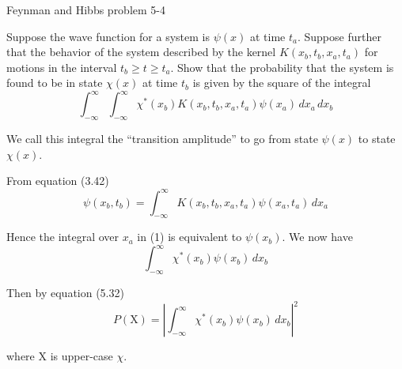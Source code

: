 \documentclass[12pt]{article}
\begin{document}
\begin{center}
Feynman and Hibbs problem 5-4
\end{center}

Suppose the wave function for a system is $\psi(x)$ at time $t_a$.
Suppose further that the behavior of the system described by
the kernel $K(x_b,t_b,x_a,t_a)$ for motions in the interval
$t_b\ge t\ge t_a$.
Show that the probability that the system is found to be in state
$\chi(x)$ at time $t_b$ is given by the square of the integral
\begin{equation*}
\int_{-\infty}^\infty\int_{-\infty}^\infty
\chi^*(x_b)
K(x_b,t_b,x_a,t_a)
\psi(x_a)
\,dx_a\,dx_b
\tag{1}
\end{equation*}

We call this integral the ``transition amplitude'' to go from
state $\psi(x)$ to state $\chi(x)$.

\bigskip
From equation (3.42)
\begin{equation*}
\psi(x_b,t_b)=\int_{-\infty}^\infty
K(x_b,t_b,x_a,t_a)
\psi(x_a,t_a)
\,dx_a
\end{equation*}

Hence the integral over $x_a$ in (1) is equivalent to $\psi(x_b)$.
We now have
\begin{equation*}
\int_{-\infty}^\infty
\chi^*(x_b)
\psi(x_b)
\,dx_b
\end{equation*}

Then by equation (5.32)
\begin{equation*}
P(\mathrm X)=\left|
\int_{-\infty}^\infty
\chi^*(x_b)
\psi(x_b)
\,dx_b
\right|^2
\end{equation*}

where $\mathrm X$ is upper-case $\chi$.
\end{document}

